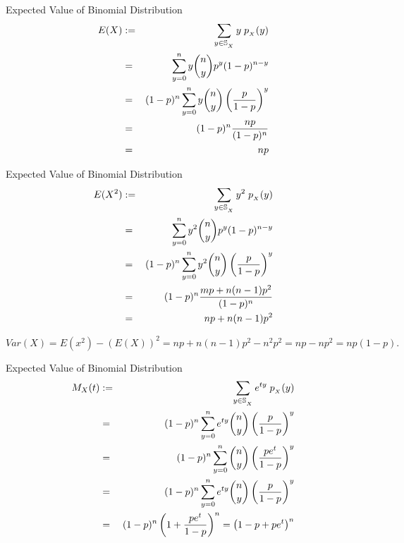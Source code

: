 \documentclass[compress]{beamer}
\begin{document}
\begin{frame}{Expected Value of Binomial Distribution}
\begin{eqnarray}
E(X)& := &  \sum_{y\in \support[X]} y\; \pmf_{_X}(y) \nonumber\\
& = &  \sum_{y=0}^{n} y {n\choose y}p^y(1-p)^{n-y}  \nonumber\\
& =& (1-p)^{n}  \sum_{y=0}^{n}  y {n\choose y}\left( \frac{p}{1-p}\right)^y   \nonumber\\
& =& (1-p)^{n}  \frac{np}{(1-p)^n} \nonumber\\
& =& np
\end{eqnarray}

\end{frame}


\begin{frame}{Expected Value of Binomial Distribution}
\begin{eqnarray}
E(X^2)& := &  \sum_{y\in \support[X]} y^2\; \pmf_{_X}(y) \nonumber\\
& = &  \sum_{y=0}^{n} y^2 {n\choose y}p^y(1-p)^{n-y}  \nonumber\\
& =& (1-p)^{n}  \sum_{y=0}^{n}  y^2 {n\choose y}\left( \frac{p}{1-p}\right)^y   \nonumber\\
& =& (1-p)^{n}  \frac{mp+ n(n-1)p^2}{(1-p)^n} \nonumber\\
& =& np+ n(n-1)p^2
\end{eqnarray}

$Var(X)= E(x^2)- (E(X))^2= np+n(n-1)p^2- n^2p^2= np-np^2= np(1-p). $

\end{frame}



\begin{frame}{Expected Value of Binomial Distribution}
\begin{eqnarray}
M_X(t)& := &  \sum_{y\in \support[X]} e^{ty}\; \pmf_{_X}(y) \nonumber\\
& =& (1-p)^{n}  \sum_{y=0}^{n}  e^{ty} {n\choose y}\left( \frac{p}{1-p}\right)^y   \nonumber\\
& =& (1-p)^{n}  \sum_{y=0}^{n}  {n\choose y}\left( \frac{pe^{t}}{1-p}\right)^y   \nonumber\\
& =& (1-p)^{n}  \sum_{y=0}^{n}  e^{ty} {n\choose y}\left( \frac{p}{1-p}\right)^y   \nonumber\\
& =& (1-p)^{n} \left( 1+  \frac{pe^t}{1-p} \right)^n = \left( 1-p+pe^t\right)^n  \nonumber\\
\end{eqnarray}



\end{frame}
\end{document}
